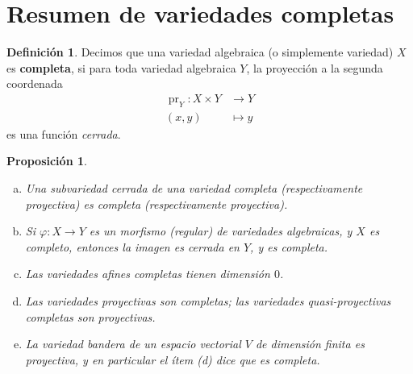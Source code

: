 \documentclass[spanish,12pt]{amsart}
\newtheorem{proposition}[theorem]{Proposición}
\theoremstyle{definition}
\newtheorem{definition}[theorem]{Definición}
\theoremstyle{remark}
\numberwithin{equation}{section}
\begin{document}
\section{Resumen de variedades completas}

\begin{definition}
Decimos que una variedad algebraica (o simplemente variedad) $X$ es \textbf{completa}, si para toda variedad algebraica $Y$, la proyección a la segunda coordenada
\begin{align*}
\operatorname{pr}_Y : X \times Y &\longrightarrow Y \\
(x,y) &\longmapsto y
\end{align*}
es una función \textit{cerrada}.
\end{definition}

\begin{proposition}\label{proposicion:hechos sobre variedades completas}
\begin{enumerate}[(a)]
\item Una subvariedad cerrada de una variedad completa (respectivamente proyectiva) es completa (respectivamente proyectiva).
\item Si $\varphi : X \to Y$ es un morfismo (regular) de variedades algebraicas, y $X$ es completo, entonces la imagen es cerrada en $Y$, y es completa.
\item Las variedades afines completas tienen dimensión $0$.
\item Las variedades proyectivas son completas; las variedades quasi-proyectivas completas son proyectivas.
\item La \textit{variedad bandera} de un espacio vectorial $V$ de dimensión finita es proyectiva, y en particular el ítem (d) dice que es completa.
\end{enumerate}
\end{proposition}
\end{document}
